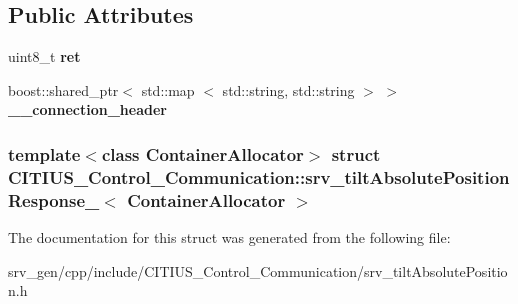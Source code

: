 \subsection*{\-Public \-Attributes}
\begin{DoxyCompactItemize}
\item 
\hypertarget{struct_c_i_t_i_u_s___control___communication_1_1srv__tilt_absolute_position_response___a715233887b2f06d90dcb3571d7aa04a6}{uint8\-\_\-t {\bfseries ret}}\label{struct_c_i_t_i_u_s___control___communication_1_1srv__tilt_absolute_position_response___a715233887b2f06d90dcb3571d7aa04a6}

\item 
\hypertarget{struct_c_i_t_i_u_s___control___communication_1_1srv__tilt_absolute_position_response___a13199bca8a60a19c53e200c5f3ee4e72}{boost\-::shared\-\_\-ptr$<$ std\-::map\*
$<$ std\-::string, std\-::string $>$ $>$ {\bfseries \-\_\-\-\_\-connection\-\_\-header}}\label{struct_c_i_t_i_u_s___control___communication_1_1srv__tilt_absolute_position_response___a13199bca8a60a19c53e200c5f3ee4e72}

\end{DoxyCompactItemize}
\subsubsection*{template$<$class Container\-Allocator$>$ struct C\-I\-T\-I\-U\-S\-\_\-\-Control\-\_\-\-Communication\-::srv\-\_\-tilt\-Absolute\-Position\-Response\-\_\-$<$ Container\-Allocator $>$}



\-The documentation for this struct was generated from the following file\-:\begin{DoxyCompactItemize}
\item 
srv\-\_\-gen/cpp/include/\-C\-I\-T\-I\-U\-S\-\_\-\-Control\-\_\-\-Communication/srv\-\_\-tilt\-Absolute\-Position.\-h\end{DoxyCompactItemize}

